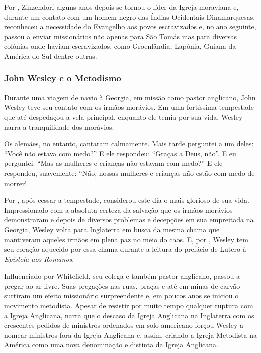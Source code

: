 \documentclass[
    article,            %
	12pt,				%
	oneside,			%
	a4paper,			%
	chapter=TITLE,		%
	section=TITLE,		%
	english,			%
	french,				%
	spanish,			%
	brazil				%
	]{abntex2}
\begin{document}
Por , Zinzendorf alguns anos depois se tornou o líder da Igreja moraviana e, durante um contato com um homem negro das Índias Ocidentais Dinamarquesas, reconheceu a necessidade do Evangelho aos povos escravizados e, no ano seguinte, passou a enviar missionários não apenas para São Tomás mas para diversas colônias onde haviam escravizados, como Groenlândia, Lapônia, Guiana da América do Sul dentre outras.

\subsubsection{John Wesley e o Metodismo}
Durante uma viagem de navio à Georgia, em missão como pastor anglicano, John Wesley teve seu contato com os irmãos morávios. Em uma fortíssima tempestade que até despedaçou a vela principal, enquanto ele temia por sua vida, Wesley narra a tranquilidade dos morávios:
\begin{citacao}
Os alemães, no entanto, cantaram calmamente. Mais tarde perguntei a um deles: “Você não estava com medo?” E ele respondeu: “Graças a Deus, não”. E eu perguntei: “Mas as mulheres e crianças não estavam com medo?” E ele respondeu, suavemente: “Não, nossas mulheres e crianças não estão com medo de morrer! \cite[p.17]{WESLEY}
\end{citacao}

Por , após cessar a tempestade, considerou este dia o mais glorioso de sua vida. Impressionado com a absoluta certeza da salvação que os irmãos morávios demonstraram e depois de diversos problemas e decepções em sua empreitada na Georgia, Wesley volta para Inglaterra em busca da mesma chama que mantiveram aqueles irmãos em plena paz no meio do caos. E, por , Wesley tem seu coração aquecido por essa chama durante a leitura do prefácio de Lutero à \emph{Epístola aos Romanos}.

Influenciado por Whitefield, seu colega e também pastor anglicano, passou a pregar ao ar livre. Suas pregações nas ruas, praças e até em minas de carvão surtiram um efeito missionário surpreendente e, em poucos anos se iniciou o movimento metodista. Apesar de resistir por muito tempo qualquer ruptura com a Igreja Anglicana,  narra que o descaso da Igreja Anglicana na Inglaterra com os crescentes pedidos de ministros ordenados em solo americano forçou Wesley a nomear ministros fora da Igreja Anglicana e, assim, criando a Igreja Metodista na América como uma nova denominação e distinta da Igreja Anglicana.
\end{document}
